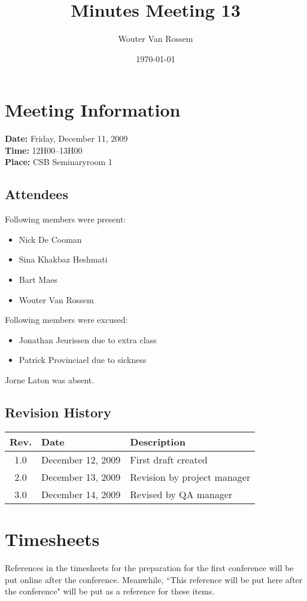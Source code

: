 \documentclass[a4paper, 12pt]{article}
\begin{document}
\title{Minutes Meeting 13}
\author{Wouter Van Rossem}
\date{\today}

\maketitle	
	\section{Meeting Information}
		\textbf{Date:} Friday, December 11, 2009\\
		\textbf{Time:} 12H00--13H00\\
		\textbf{Place:} CSB Seminaryroom 1\\
		\subsection{Attendees}
Following members were present:
			\begin{itemize}
				\item Nick De Cooman
				\item Sina Khakbaz Heshmati
				\item Bart Maes
				\item Wouter Van Rossem
			\end{itemize}
Following members were excused:
			\begin{itemize}
				\item Jonathan Jeurissen due to extra class
				\item Patrick Provinciael due to sickness
			\end{itemize}
Jorne Laton	was absent.		
			
		\subsection{Revision History}
			\begin{tabular}{c | l | l }
				\textbf{Rev.} & \textbf{Date} & \textbf{Description} \\
				\hline
				1.0 & December 12, 2009 & First draft created \\
				2.0 & December 13, 2009 & Revision by project manager \\
				3.0 & December 14, 2009 & Revised by QA manager \\
				

			\end{tabular}		

	\section{Timesheets}
References in the timesheets for the preparation for the first conference will be put online after the conference. Meanwhile, ``This reference will be put here after the conference" will be put as a reference for these items.
\end{document}
